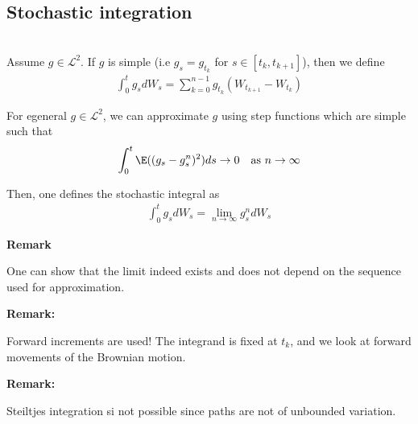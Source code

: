 \subsection{Stochastic integration}\hfill\\
\noindent Assume $g\in\mathcal{L}^2$. If $g$ is simple (i.e $g_s = g_{t_k}$ for $s\in[t_k,t_{k+1}]$), then we define
\begin{equation*}
  \begin{gathered}
    \int_{0}^{t}g_sdW_s = \sum_{k=0}^{n-1}g_{t_k}(W_{t_{k+1}}-W_{t_k})
  \end{gathered}
\end{equation*}
\par\bigskip
\noindent For egeneral $g\in\mathcal{L}^2$, we can approximate $g$ using step functions which are simple such that
\begin{equation*}
  \begin{gathered}
    \int_{0}^{t}\E((g_s-g_s^n)^2)ds \to0\quad\text{as } n\to\infty
  \end{gathered}
\end{equation*}\par
\noindent Then, one defines the stochastic integral as
\begin{equation*}
  \begin{gathered}
    \int_{0}^{t}g_sdW_s = \lim_{n\to\infty}g_s^ndW_s
  \end{gathered}
\end{equation*}
\par\bigskip
\noindent\textbf{Remark}\par
\noindent One can show that the limit indeed exists and does not depend on the sequence used for approximation.
\par\bigskip
\noindent\textbf{Remark:}\par
\noindent Forward increments are used! The integrand is fixed at $t_k$, and we look at forward movements of the Brownian motion.
\par\bigskip
\noindent\textbf{Remark:}\par
\noindent Steiltjes integration si not possible since paths are not of unbounded variation.
\par\bigskip
